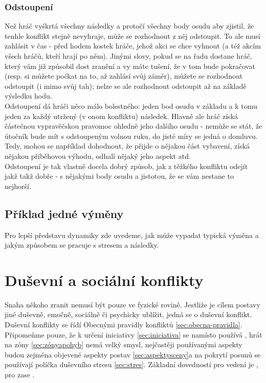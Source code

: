 \subsubsection{Odstoupení}
\label{sec:odstoupeni}

Než hráč vyškrtá všechny následky a protočí všechny body osudu aby zjistil, že tenhle konflikt stejně nevyhraje, může se rozhodnout z něj odstoupit. To ale musí zahlásit v čas - před hodem kostek hráče, jehož akci se chce vyhnout (a též akcím všech hráčů, kteří hrají po něm). Jinými slovy, pokud se na řadu dostane hráč, který vám již způsobil dost zranění a vy máte tušení, že v tom bude pokračovat (resp. si můžete počkat na to, až zahlásí svůj záměr), můžete se rozhodnout odstoupit (i mimo svůj tah); nelze se ale rozhodnout odstoupit až na základě výsledku hodu.\\
Odstoupení dá hráči něco málo bolestného: jeden bod osudu v základu a k tomu jeden za každý utržený (v onom konfliktu) následek. Hlavně ale hráč získá částečnou vypravěčskou pravomoc ohledně jeho dalšího osudu - nemůže se stát, že útočník bude mít s odstoupeným volnou ruku, do jisté míry se jedná o domluvu. Tedy, mohou se například dohodnout, že přijde o nějakou část vybavení, získá nějakou příběhovou výhodu, odhalí nějaký jeho aspekt atd. \\
Odstoupení je tak vlastně docela dobrý způsob, jak z těžkého konfliktu odejít jakž takž dobře - s nějakými body osudu a jistotou, že se vám nestane to nejhorší. 

\subsection{Příklad jedné výměny}
\label{sec:priklad-vymena}

Pro lepší představu dynamiky zde uvedeme, jak může vypadat typická výměna a jakým způsobem se pracuje s stresem a následky.

\section{Duševní a sociální konflikty}
\label{sec:dusevni-soc-konflikty}

Snaha někoho zranit nemusí být pouze ve fyzické rovině. Jestliže je cílem postavy jiné duševně, emočně, sociálně či psychicky ublížit, jedná se o duševní konflikt. \\
Duševní konflikty se řídí Obecnými pravidly konfliktů \ref{sec:obecna-pravidla}. Připomeňme pouze, že k určení iniciativy \ref{sec:iniciativa} se namísto  používá , hrát na zóny \ref{sec:zónyapohyb} nemá velký smysl, nejčastěji používanými aspekty budou zejména objevené aspekty postav \ref{sec:aspektysceny}a na pokrytí posunů se používají políčka duševního stresu \ref{sec:stres}. Základní dovedností pro vedení  je , pro  zase .

